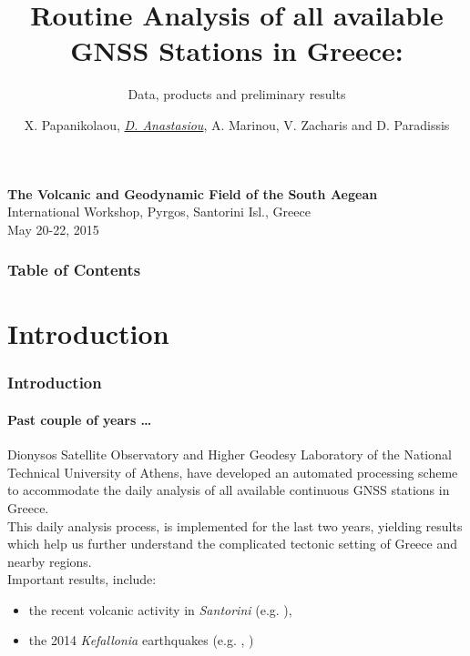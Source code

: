 \documentclass{beamer}
\title{Routine Analysis of all available GNSS Stations in Greece:}
\subtitle{Data, products and preliminary results}
\date{}
\author{X. Papanikolaou, \emph{\underline{D. Anastasiou}}, A. Marinou, V. Zacharis and D. Paradissis}
\institute{National Technical University of Athens\\Dionysos Satellite Observatory\\\url{http://dionysos.survey.ntua.gr}}
\begin{document}
\begin{frame}[plain]
\maketitle
\begin{block}{}
    \begin{center}
    \textbf{The Volcanic and Geodynamic Field of the South Aegean}\\
    International Workshop, Pyrgos, Santorini Isl., Greece \\
    May 20-22, 2015
    \end{center}
\end{block}
\end{frame}

\begin{frame}
    \frametitle{Table of Contents}
    \tableofcontents
\end{frame}

\section{Introduction}

\begin{frame}\frametitle{Introduction}\framesubtitle{Past couple of years \dots}

Dionysos Satellite Observatory and Higher Geodesy Laboratory of the National Technical University of Athens, have developed an
automated processing scheme to accommodate the daily analysis of all available continuous GNSS stations in Greece.
\\
This daily analysis process, is implemented for the last two years, yielding results which help us further understand the complicated
tectonic setting of Greece and nearby regions.
\\
Important results, include:
\begin{itemize}
    \item the recent volcanic activity in \emph{Santorini} (e.g. \cite{papoutsis}),
    \item the 2014 \emph{Kefallonia} earthquakes (e.g. \cite{sarkefalonia}, \cite{sakkas})
\end{itemize}

\end{frame}
\end{document}
